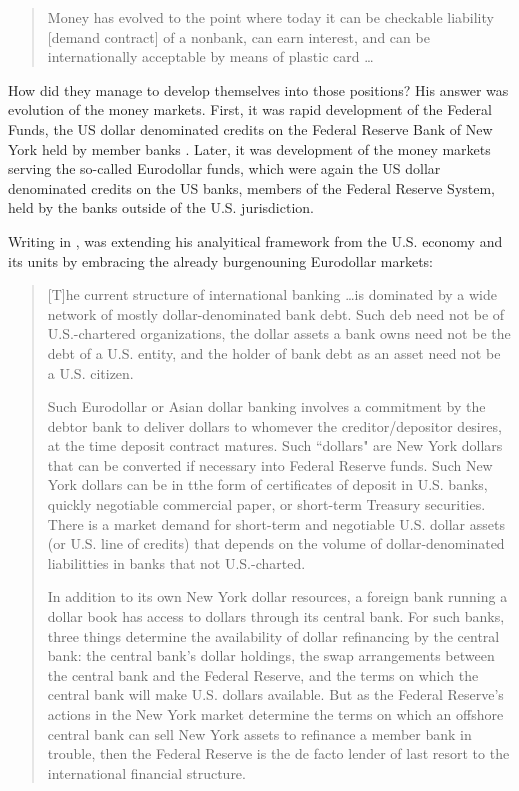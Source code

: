 \begin{quote}
Money has evolved to the point where today it can be checkable liability [demand contract] of a nonbank, can earn interest, and can be internationally acceptable by means of plastic card \dots~\citep[p.~13]{minsky1985_}
\end{quote} 

How did they manage to develop themselves into those positions? His answer was evolution of the money markets. First, it was rapid development of the Federal Funds, the US dollar denominated credits on the Federal Reserve Bank of New York held by member banks \citep{minsky1957}. Later, it was development of the money markets serving the so-called Eurodollar funds, which were again the US dollar denominated credits on the US banks, members of the Federal Reserve System, held by the banks outside of the U.S. jurisdiction.

Writing in \citeyear{minsky1985_}, \citeauthor{minsky1985_} was extending his analyitical framework from the U.S. economy and its units by embracing the already burgenouning Eurodollar markets:

\begin{quote}
[T]he current structure of international banking \dots is dominated by a wide network of mostly dollar-denominated bank debt. Such deb need not be of U.S.-chartered organizations, the dollar assets a bank owns need not be the debt of a U.S. entity, and the holder of bank debt as an asset need not be a U.S. citizen.\par Such Eurodollar or Asian dollar banking involves a commitment by the debtor bank to deliver dollars to whomever the creditor/depositor desires, at the time deposit contract matures. Such ``dollars" are New York dollars that can be converted if necessary into Federal Reserve funds. Such New York dollars can be in tthe form of certificates of deposit in U.S. banks, quickly negotiable commercial paper, or short-term Treasury securities. There is a market demand for short-term and negotiable U.S. dollar assets (or U.S. line of credits) that depends on the volume of dollar-denominated liabilitties in banks that not U.S.-charted.\par In addition to its own New York dollar resources, a foreign bank running a dollar book has access to dollars through its central bank. For such banks, three things determine the availability of dollar refinancing by the central bank: the central bank's dollar holdings, the swap arrangements between the central bank and the Federal Reserve, and the terms on which the central bank will make U.S. dollars available. But as the Federal Reserve's actions in the New York market determine the terms on which an offshore central bank can sell New York assets to refinance a member bank in trouble, then the Federal Reserve is the de facto lender of last resort to the international financial structure.~\citep[p.~15]{minsky1985_}
\end{quote}

